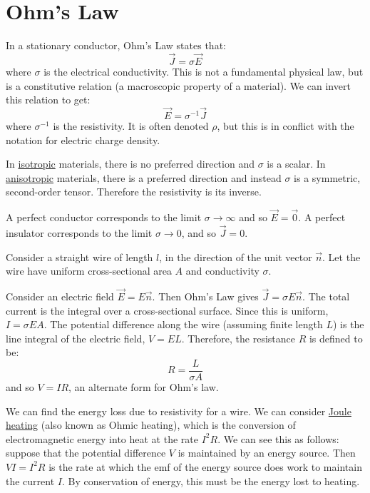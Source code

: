 \documentclass[../Main.tex]{subfiles}
\begin{document}
\section{Ohm's Law}
In a stationary conductor, Ohm's Law states that:
\begin{equation*}
    \vec{J} = \sigma \vec{E}
\end{equation*}
where $\sigma$ is the electrical conductivity. This is not a fundamental physical law, but is a constitutive relation (a macroscopic property of a material). We can invert this relation to get:
\begin{equation*}
    \vec{E} = \sigma^{-1} \vec{J}
\end{equation*}
where $\sigma^{-1}$ is the resistivity. It is often denoted $\rho$, but this is in conflict with the notation for electric charge density.
\begin{remark}
    In \underline{isotropic} materials, there is no preferred direction and $\sigma$ is a scalar. In \underline{anisotropic} materials, there is a preferred direction and instead $\sigma$ is a symmetric, second-order tensor. Therefore the resistivity is its inverse.
\end{remark}
A perfect conductor corresponds to the limit $\sigma \to \infty$ and so $\vec{E} = \vec0$. A perfect insulator corresponds to the limit $\sigma \to 0$, and so $\vec{J} = 0$.
\begin{example}
    Consider a straight wire of length $l$, in the direction of the unit vector $\vec{n}$. Let the wire have uniform cross-sectional area $A$ and conductivity $\sigma$.

    Consider an electric field $\vec{E} = E\vec{n}$. Then Ohm's Law gives $\vec{J} = \sigma E\vec{n}$. The total current is the integral over a cross-sectional surface. Since this is uniform, $I = \sigma E A$. The potential difference along the wire (assuming finite length $L$) is the line integral of the electric field, $V = EL$. Therefore, the resistance $R$ is defined to be:
    \begin{equation*}
        R = \frac{L}{\sigma A}
    \end{equation*}
    and so $V = IR$, an alternate form for Ohm's law.
\end{example}
We can find the energy loss due to resistivity for a wire. We can consider \underline{Joule heating} (also known as Ohmic heating), which is the conversion of electromagnetic energy into heat at the rate $I^2 R$. We can see this as follows: suppose that the potential difference $V$ is maintained by an energy source. Then $VI = I^2 R$ is the rate at which the emf of the energy source does work to maintain the current $I$. By conservation of energy, this must be the energy lost to heating.
\end{document}
